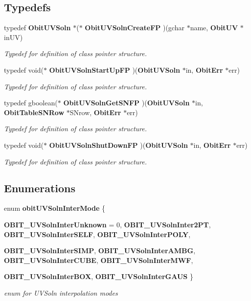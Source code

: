 \subsection*{Typedefs}
\begin{CompactItemize}
\item 
typedef {\bf Obit\-UVSoln} $\ast$($\ast$ {\bf Obit\-UVSoln\-Create\-FP} )(gchar $\ast$name, {\bf Obit\-UV} $\ast$in\-UV)
\begin{CompactList}\small\item\em Typedef for definition of class pointer structure. \item\end{CompactList}\item 
typedef void($\ast$ {\bf Obit\-UVSoln\-Start\-Up\-FP} )({\bf Obit\-UVSoln} $\ast$in, {\bf Obit\-Err} $\ast$err)
\begin{CompactList}\small\item\em Typedef for definition of class pointer structure. \item\end{CompactList}\item 
typedef gboolean($\ast$ {\bf Obit\-UVSoln\-Get\-SNFP} )({\bf Obit\-UVSoln} $\ast$in, {\bf Obit\-Table\-SNRow} $\ast$SNrow, {\bf Obit\-Err} $\ast$err)
\begin{CompactList}\small\item\em Typedef for definition of class pointer structure. \item\end{CompactList}\item 
typedef void($\ast$ {\bf Obit\-UVSoln\-Shut\-Down\-FP} )({\bf Obit\-UVSoln} $\ast$in, {\bf Obit\-Err} $\ast$err)
\begin{CompactList}\small\item\em Typedef for definition of class pointer structure. \item\end{CompactList}\end{CompactItemize}
\subsection*{Enumerations}
\begin{CompactItemize}
\item 
enum {\bf obit\-UVSoln\-Inter\-Mode} \{ \par
{\bf OBIT\_\-UVSoln\-Inter\-Unknown} = 0, 
{\bf OBIT\_\-UVSoln\-Inter2PT}, 
{\bf OBIT\_\-UVSoln\-Inter\-SELF}, 
{\bf OBIT\_\-UVSoln\-Inter\-POLY}, 
\par
{\bf OBIT\_\-UVSoln\-Inter\-SIMP}, 
{\bf OBIT\_\-UVSoln\-Inter\-AMBG}, 
{\bf OBIT\_\-UVSoln\-Inter\-CUBE}, 
{\bf OBIT\_\-UVSoln\-Inter\-MWF}, 
\par
{\bf OBIT\_\-UVSoln\-Inter\-BOX}, 
{\bf OBIT\_\-UVSoln\-Inter\-GAUS}
 \}
\begin{CompactList}\small\item\em enum for UVSoln interpolation modes \item\end{CompactList}\end{CompactItemize}
